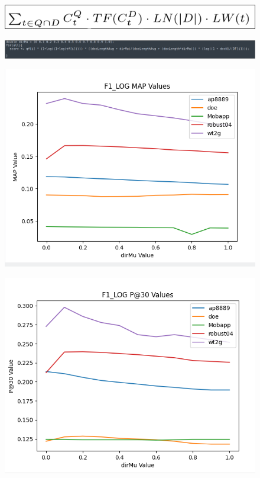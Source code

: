 \documentclass{article}
\begin{document}
\begin{figure}[h!]
\centering
\includegraphics[scale=0.45]{F1_LOG_FORMULA_MATH.png}
\caption{}
\end{figure}

\begin{figure}[h!]
\centering
\includegraphics[scale=0.45]{F1_LOG_FORMULA.png}
\caption{}
\end{figure}

\begin{figure}[h!]
\centering
\includegraphics[scale=0.40]{F1_LOG_MAP_VALUES.png}
\caption{}
\end{figure}

\begin{figure}[h!]
\centering
\includegraphics[scale=0.40]{F1_LOG_P30_VALUES.png}
\caption{}
\end{figure}
\end{document}

